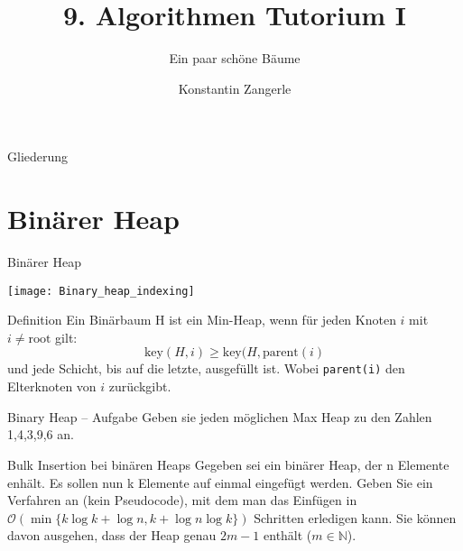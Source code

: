 \documentclass[18pt]{beamer}
\title[Algo I Tut]{9. Algorithmen Tutorium I}
\subtitle{Ein paar schöne Bäume}
\author[Zangerle]{Konstantin Zangerle}
\institute{Institut für Theoretische Informatik}
\newcommand{\N}{\mathbb{N}}
\newcommand{\Oh}{\mathcal{O}}
\begin{document}

\begin{frame}
\titlepage
\end{frame}

\begin{frame}{Gliederung}
 \tableofcontents
\end{frame}

\section{Binärer Heap}
\begin{frame}[fragile]{Binärer Heap}

\hspace{13em}
\texttt{[image: Binary\_heap\_indexing]}
 \begin{block}{Definition}
  Ein Binärbaum H ist ein Min-Heap, wenn für jeden Knoten $i$ mit $i \neq \text{root}$ gilt:
  $$\text{key}(H,i) \geq \text{key}(H,\text{parent}(i)$$
  und jede Schicht, bis auf die letzte, ausgefüllt ist.
  Wobei \verb|parent(i)| den Elterknoten von $i$ zurückgibt.
 \end{block}

\end{frame}

\begin{frame}{Binary Heap -- Aufgabe}
Geben sie jeden möglichen Max Heap zu den Zahlen 1,4,3,9,6 an.
\end{frame}

\begin{frame}{Bulk Insertion bei binären Heaps}
Gegeben sei ein binärer Heap, der n Elemente enhält. Es sollen nun k Elemente auf einmal
eingefügt werden. Geben Sie ein Verfahren an (kein Pseudocode), mit dem man das Einfügen in $\Oh(\min\{k \log k + \log n, k + \log n \log k \})$ Schritten erledigen kann.
Sie können davon ausgehen, dass der Heap genau $2m - 1$ enthält ($m \in \N$).
\end{frame}
\end{document}
